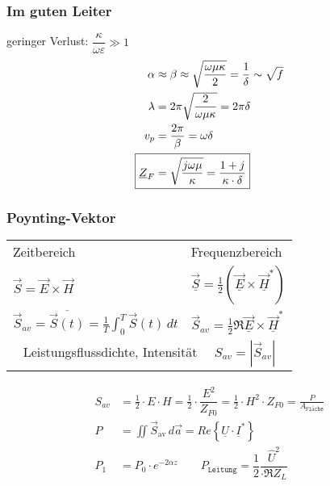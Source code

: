 \subsubsection{Im guten Leiter}
geringer Verlust: $\dfrac{\kappa}{\omega\varepsilon} \gg 1$
\begin{align*}
    \alpha                  & \approx \beta \approx\sqrt{\frac{\omega\mu\kappa}{2}}=\dfrac{1}{\delta}\sim\sqrt{f} \\
    \lambda                 & = 2\pi \sqrt{\dfrac{2}{\omega\mu\kappa}}=2\pi\delta                                 \\
    v_p                     & = \frac{2\pi}{\beta} = \omega\delta                                                 \\
    \Aboxed{\underline{Z}_F & = \sqrt{\dfrac{j\omega\mu}{\kappa}} = \dfrac{1+j}{\kappa\cdot\delta}}
\end{align*}

\subsubsection{Poynting-Vektor}
\begin{tabular}{ll}
	Zeitbereich                                                                        & Frequenzbereich                                                                        \\
	$\vec{S} = \vec{E} \times \vec{H}$                                                 & $\vec{\underline{S}} = \frac{1}{2} (\underline{\vec{E}} \times \underline{\vec{H}}^*)$ \\
	$\vec{S}_{av} = \overline{\vec{S}(t)} = \frac{1}{T} \int_{0}^{T} \vec{S}(t) \,dt $ & $\vec{S}_{av} = \frac{1}{2} \Re{\underline{\vec{E}} \times \underline{\vec{H}}^*}$     \\
	\multicolumn{2}{c}{Leistungsflussdichte, Intensität $\quad S_{av} = |\vec{S}_{av}|$}                                                                                      \\
\end{tabular}
\begin{align*}
	S_{av} & =  \frac{1}{2} \cdot E \cdot H
	=  \frac{1}{2} \cdot \dfrac{E^2}{Z_{F0}}
	=  \frac{1}{2} \cdot H^2 \cdot Z_{F0}
	=  \frac{P}{A_\texttt{Fläche}}                                                                                   \\
	P      & = \iint\vec{S}_{\text{av}}\, d\vec{a}
	= Re\left\{\underline{U}\cdot\underline{I}^*\right\}                                                             \\
	P_1    & = P_0 \cdot e^{-2\alpha z} \qquad P_{\texttt{Leitung}} = \dfrac{1}{2} \dfrac{\hat{U}^2}{\cdot \Re{Z_L}}
\end{align*}

